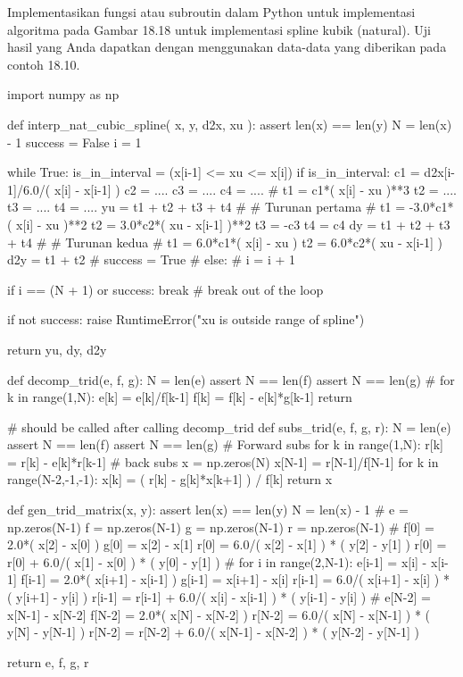 \begin{soal}
Implementasikan fungsi atau subroutin dalam Python untuk implementasi algoritma
pada Gambar 18.18 untuk implementasi spline kubik (natural).
Uji hasil yang Anda dapatkan dengan menggunakan data-data yang diberikan pada contoh
18.10.
\end{soal}

\begin{pythoncode}
import numpy as np

def interp_nat_cubic_spline( x, y, d2x, xu ):    
    assert len(x) == len(y)
    N = len(x) - 1
    success = False
    i = 1
    
    while True:
        is_in_interval = (x[i-1] <= xu <= x[i])    
        if is_in_interval:
            c1 = d2x[i-1]/6.0/( x[i] - x[i-1] )
            c2 = ....
            c3 = ....
            c4 = ....
            #
            t1 = c1*( x[i] - xu )**3
            t2 = ....
            t3 = ....
            t4 = ....
            yu = t1 + t2 + t3 + t4
            #
            # Turunan pertama
            #
            t1 = -3.0*c1*( x[i] - xu )**2
            t2 = 3.0*c2*( xu - x[i-1] )**2
            t3 = -c3
            t4 = c4
            dy = t1 + t2 + t3 + t4
            #
            # Turunan kedua
            #
            t1 = 6.0*c1*( x[i] - xu )
            t2 = 6.0*c2*( xu - x[i-1] )
            d2y = t1 + t2
            #
            success = True
            #
        else:
            #
            i = i + 1
        
        if i == (N + 1) or success:
            break # break out of the loop
    
    if not success:
        raise RuntimeError("xu is outside range of spline")
        
    return yu, dy, d2y

def decomp_trid(e, f, g):
    N = len(e)
    assert N == len(f)
    assert N == len(g)
    #
    for k in range(1,N):
        e[k] = e[k]/f[k-1]
        f[k] = f[k] - e[k]*g[k-1]
    return
    
# should be called after calling decomp_trid
def subs_trid(e, f, g, r):
    N = len(e)
    assert N == len(f)
    assert N == len(g)
    # Forward subs
    for k in range(1,N):
        r[k] = r[k] - e[k]*r[k-1]
    # back subs
    x = np.zeros(N)
    x[N-1] = r[N-1]/f[N-1]
    for k in range(N-2,-1,-1):
        x[k] = ( r[k] - g[k]*x[k+1] ) / f[k]
    return x    
    
def gen_trid_matrix(x, y):
    assert len(x) == len(y)
    N = len(x) - 1
    #
    e = np.zeros(N-1)
    f = np.zeros(N-1)
    g = np.zeros(N-1)
    r = np.zeros(N-1)
    #
    f[0] = 2.0*( x[2] - x[0] )
    g[0] = x[2] - x[1]
    r[0] = 6.0/( x[2] - x[1] ) * ( y[2] - y[1] )
    r[0] = r[0] + 6.0/( x[1] - x[0] ) * ( y[0] - y[1] )
    #
    for i in range(2,N-1):
        e[i-1] = x[i] - x[i-1]
        f[i-1] = 2.0*( x[i+1] - x[i-1] )
        g[i-1] = x[i+1] - x[i]
        r[i-1] = 6.0/( x[i+1] - x[i] ) * ( y[i+1] - y[i] )
        r[i-1] = r[i-1] + 6.0/( x[i] - x[i-1] ) * ( y[i-1] - y[i] )
    #    
    e[N-2] = x[N-1] - x[N-2]
    f[N-2] = 2.0*( x[N] - x[N-2] )
    r[N-2] = 6.0/( x[N] - x[N-1] ) * ( y[N] - y[N-1] )
    r[N-2] = r[N-2] + 6.0/( x[N-1] - x[N-2] ) * ( y[N-2] - y[N-1] )
    
    return e, f, g, r    
\end{pythoncode}